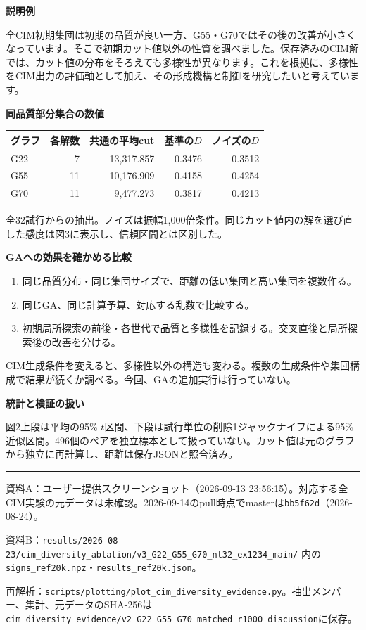 \documentclass[11pt,a4paper,landscape]{ltjsarticle}
\newcommand{\boxnote}[1]{\begingroup\setlength{\fboxsep}{8pt}\colorbox{light}{\parbox{\dimexpr\linewidth-16pt\relax}{#1}}\endgroup}
\renewcommand{\strong}[1]{{\bfseries\color{ink}#1}}
\newcommand{\smallnote}[1]{{\footnotesize\color{muted}#1\par}}
\begin{document}
\begin{minipage}[t]{0.53\linewidth}
\strong{説明例}

\boxnote{全CIM初期集団は初期の品質が良い一方、G55・G70ではその後の改善が小さくなっています。そこで初期カット値以外の性質を調べました。保存済みのCIM解では、カット値の分布をそろえても多様性が異なります。これを根拠に、多様性をCIM出力の評価軸として加え、その形成機構と制御を研究したいと考えています。}

\vspace{3mm}
\strong{同品質部分集合の数値}

{\small
\begin{tabular}{lrrrr}
\toprule
グラフ & 各解数 & 共通の平均cut & 基準の$D$ & ノイズの$D$\\
\midrule
G22 & 7 & 13,317.857 & 0.3476 & 0.3512\\
G55 & 11 & 10,176.909 & 0.4158 & 0.4254\\
G70 & 11 & 9,477.273 & 0.3817 & 0.4213\\
\bottomrule
\end{tabular}}

\smallnote{全32試行からの抽出。ノイズは振幅1,000倍条件。同じカット値内の解を選び直した感度は図3に表示し、信頼区間とは区別した。}
\end{minipage}\hfill
\begin{minipage}[t]{0.43\linewidth}
\strong{GAへの効果を確かめる比較}

\begin{enumerate}
\setlength{\itemsep}{3pt}
\item 同じ品質分布・同じ集団サイズで、距離の低い集団と高い集団を複数作る。
\item 同じGA、同じ計算予算、対応する乱数で比較する。
\item 初期局所探索の前後・各世代で品質と多様性を記録する。交叉直後と局所探索後の改善を分ける。
\end{enumerate}

\smallnote{CIM生成条件を変えると、多様性以外の構造も変わる。複数の生成条件や集団構成で結果が続くか調べる。今回、GAの追加実行は行っていない。}

\strong{統計と検証の扱い}

\smallnote{図2上段は平均の95\% $t$区間、下段は試行単位の削除1ジャックナイフによる95\%近似区間。496個のペアを独立標本として扱っていない。カット値は元のグラフから独立に再計算し、距離は保存JSONと照合済み。}
\end{minipage}

\vfill
\hrule
\vspace{2mm}
\smallnote{資料A：ユーザー提供スクリーンショット（2026-09-13 23:56:15）。対応する全CIM実験の元データは未確認。2026-09-14のpull時点でmasterは\texttt{bb5f62d}（2026-08-24）。}
\smallnote{資料B：\nolinkurl{results/2026-08-23/cim_diversity_ablation/v3_G22_G55_G70_nt32_ex1234_main/} 内の\texttt{signs\_ref20k.npz}・\texttt{results\_ref20k.json}。}
\smallnote{再解析：\nolinkurl{scripts/plotting/plot_cim_diversity_evidence.py}。抽出メンバー、集計、元データのSHA-256は\texttt{cim\_diversity\_evidence/v2\_G22\_G55\_G70\_matched\_r1000\_discussion}に保存。}
\end{document}
